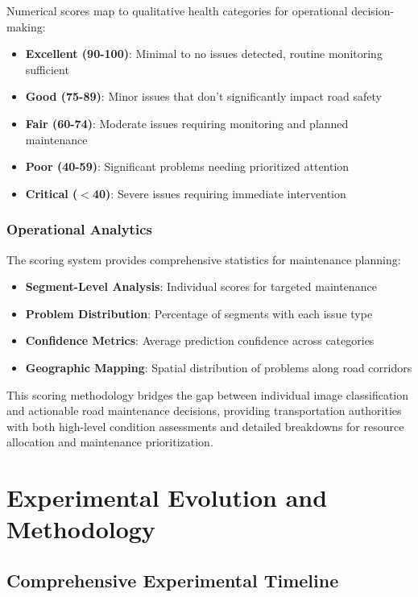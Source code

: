 \documentclass[12pt]{article}
\begin{document}
Numerical scores map to qualitative health categories for operational decision-making:

\begin{itemize}[itemsep=1pt,parsep=0pt,topsep=3pt]
\item \textbf{Excellent (90-100)}: Minimal to no issues detected, routine monitoring sufficient
\item \textbf{Good (75-89)}: Minor issues that don't significantly impact road safety
\item \textbf{Fair (60-74)}: Moderate issues requiring monitoring and planned maintenance
\item \textbf{Poor (40-59)}: Significant problems needing prioritized attention
\item \textbf{Critical ($<$40)}: Severe issues requiring immediate intervention
\end{itemize}

\subsubsection{Operational Analytics}

The scoring system provides comprehensive statistics for maintenance planning:

\begin{itemize}[itemsep=1pt,parsep=0pt,topsep=3pt]
\item \textbf{Segment-Level Analysis}: Individual scores for targeted maintenance
\item \textbf{Problem Distribution}: Percentage of segments with each issue type
\item \textbf{Confidence Metrics}: Average prediction confidence across categories
\item \textbf{Geographic Mapping}: Spatial distribution of problems along road corridors
\end{itemize}

This scoring methodology bridges the gap between individual image classification and actionable road maintenance decisions, providing transportation authorities with both high-level condition assessments and detailed breakdowns for resource allocation and maintenance prioritization.

\section{Experimental Evolution and Methodology}

\subsection{Comprehensive Experimental Timeline}
\end{document}
